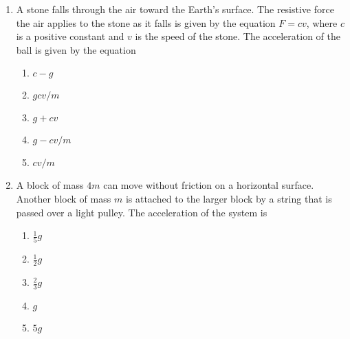 \documentclass{../../oss-apphys}
\begin{document}
\begin{multicols}{2}
\begin{enumerate}[resume,leftmargin=18pt]
    \columnbreak
    
  \item A stone falls through the air toward the Earth's surface. The resistive
    force the air applies to the stone as it falls is given by the equation
    $F=cv$, where $c$ is a positive constant and $v$ is the speed of the stone.
    The acceleration of the ball is given by the equation
    \begin{enumerate}[noitemsep,topsep=0pt,leftmargin=18pt,label=(\Alph*)]
    \item $c-g$
    \item $gcv/m$
    \item $g+cv$
    \item $g-cv/m$
    \item $cv/m$
    \end{enumerate}
    
  \item A block of mass $4m$ can move without friction on a horizontal surface.
    Another block of mass $m$ is attached to the larger block by a string that
    is passed over a light pulley. The acceleration of the system is

    \vspace{-.2in}
    \begin{enumerate}[noitemsep,topsep=0pt,leftmargin=18pt,label=(\Alph*)]
    \item $\displaystyle\frac{1}{5} g$
    \item $\displaystyle\frac{1}{2} g$
    \item $\displaystyle\frac{2}{3} g$
    \item $g$
    \item $5g$
    \end{enumerate}


\end{enumerate}
\end{multicols}
\end{document}
